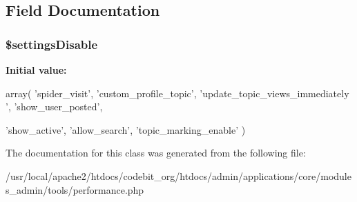 \subsection{Field Documentation}
\hypertarget{classadmin__core__tools__performance_a73cba0b2e8914123b824e50e2342722d}{
\subsubsection[{\$settings\-Disable}]{\setlength{\rightskip}{0pt plus 5cm}\$settings\-Disable\hspace{0.3cm}{\ttfamily [protected]}}}\label{classadmin__core__tools__performance_a73cba0b2e8914123b824e50e2342722d}
{\bfseries Initial value\-:}
\begin{DoxyCode}
 array( \textcolor{stringliteral}{'spider\_visit'}, \textcolor{stringliteral}{'custom\_profile\_topic'}, \textcolor{stringliteral}{'update\_topic\_views\_immediately
      '}, \textcolor{stringliteral}{'show\_user\_posted'},
                                                                                
       \textcolor{stringliteral}{'show\_active'}, \textcolor{stringliteral}{'allow\_search'}, \textcolor{stringliteral}{'topic\_marking\_enable'} )
\end{DoxyCode}


The documentation for this class was generated from the following file\-:\begin{DoxyCompactItemize}
\item 
/usr/local/apache2/htdocs/codebit\-\_\-org/htdocs/admin/applications/core/modules\-\_\-admin/tools/performance.\-php\end{DoxyCompactItemize}
